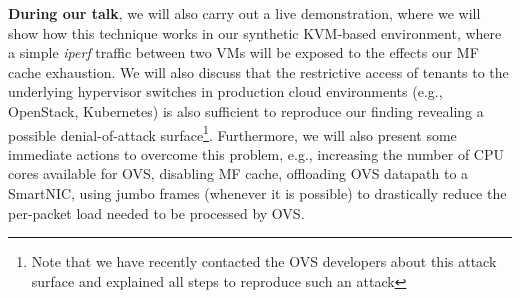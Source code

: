 \documentclass[a4paper,10pt]{article}
\begin{document}
\textbf{During our talk}, we will also carry out a live demonstration, where we will show how this technique works in our synthetic KVM-based environment, where a simple \textit{iperf} traffic between two VMs will be exposed to the effects our MF cache exhaustion.
We will also discuss that the restrictive access of tenants to the underlying hypervisor switches in production cloud environments (e.g., OpenStack, Kubernetes) is also sufficient to reproduce our finding revealing a possible denial-of-attack surface\footnote{Note that we have recently contacted the OVS developers about this attack surface and explained all steps to reproduce such an attack}.
Furthermore, we will also present some immediate actions to overcome this problem, e.g., increasing the number of CPU cores available for OVS, disabling MF cache, offloading OVS datapath to a SmartNIC, using jumbo frames (whenever it is possible) to drastically reduce the per-packet load needed to be processed by OVS.






{
}
\end{document}
